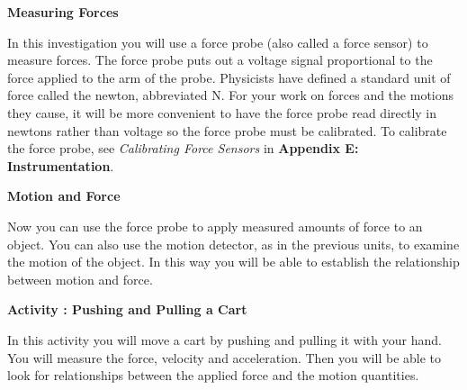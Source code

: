 \textbf{Measuring Forces} 

In this investigation you will use a force probe (also called a force sensor) to measure forces. 
The force probe puts out a voltage signal proportional to the force applied to the arm of the probe. 
Physicists have defined a standard unit of force called the newton, abbreviated N. 
For your work on forces and the motions they cause, it will be more convenient to have the force 
probe read directly in newtons rather than voltage
so the force probe must be calibrated. 
To calibrate the force probe, see \textit{Calibrating Force Sensors} in \textbf{Appendix E: Instrumentation}.

\textbf{Motion and Force} 

Now you can use the force probe to apply measured amounts of force to an object.
You can also use the motion detector, as in the previous units, to examine the
motion of the object. In this way you will be able to establish the relationship
between motion and force.
\vspace{10mm}

\newpage

\textbf{Activity : Pushing and Pulling a Cart} 

In this activity you will move a cart by pushing and pulling it with your hand.
You will measure the force, velocity and acceleration. Then you will be able
to look for relationships between the applied force and the motion quantities.

